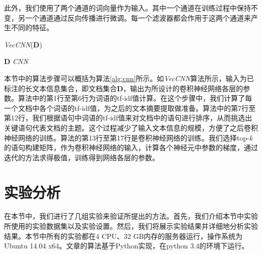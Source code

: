 此外，我们使用了两个通道的词向量作为输入。其中一个通道在训练过程中保持不变，另一个通道通过反向传播进行微调。每一个滤波器都会作用于这两个通道来产生不同的特征。

\begin{algorithm}[!ht]
    \caption{\textit{VecCNN}($\mathbf{D}$)}\label{alg:cnn}
    \begin{algorithmic}[1]
    \REQUIRE $\mathbf{D}$
    \ENSURE \textit{CNN}
        \ENDFOR
    \ENDFOR
        \ENDFOR
    \ENDFOR
    \ENDFOR
    \end{algorithmic}
\end{algorithm}

本节中的算法步骤可以概括为算法\ref{alg:cnn}所示。如\textit{VecCNN}算法所示，输入为已标注的长文本信息集合，即文档集合$\mathbf{D}$，输出为所设计的卷积神经网络各层的参数。算法中的第1行至第6行为词语的tf-idf值计算。在这个步骤中，我们计算了每一个文档中各个词语的tf-idf值，为之后的文本摘要提取做准备。算法中的第7行至第12行，我们根据语句中词语的tf-idf值来对文档中的语句进行排序，从而挑选出关键语句代表文档的主题。这个过程减少了输入文本信息的规模，方便了之后卷积神经网络的训练。算法的第13行至第17行是卷积神经网络的训练。我们选择top-$k$的语句构建矩阵，作为卷积神经网络的输入，计算各个神经元中参数的梯度，通过迭代的方法求得极值，训练得到网络各层的参数。

\section{实验分析}
\label{sec3:experiment}
在本节中，我们进行了几组实验来验证所提出的方法。首先，我们介绍本节中实验所使用的实验数据集以及实验设置。然后，我们将展示实验结果并详细地分析实验结果。本节中所有的实验都在4 CPU、32 GB内存的服务器运行，操作系统为Ubuntu 14.04 x64。文章的算法基于Python实现，在python 3.4的环境下运行。

